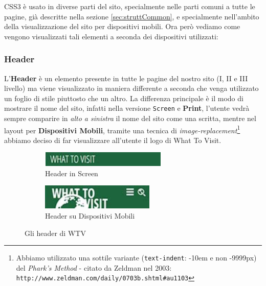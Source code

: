CSS3 è usato in diverse parti del sito, specialmente nelle parti comuni a
tutte le pagine, già descritte nella sezione \ref{sec:struttCommon}, e
specialmente nell'ambito della visualizzazione del sito per dispositivi
mobili. Ora però vediamo come vengono visualizzati tali elementi a seconda dei
dispositivi utilizzati:

\subsubsection{Header}\label{sec:Pres-Header}
L'\textbf{Header} è un elemento presente in tutte le pagine del nostro sito
(I, II e III livello) ma viene visualizzato in maniera differente a seconda
che venga utilizzato un foglio di stile piuttosto che un altro. La differenza
principale è il modo di mostrare il nome del sito, infatti nella versione
\texttt{Screen} e \textbf{Print}, l'utente vedrà sempre comparire in
\textit{alto a sinistra} il nome del sito come una scritta, mentre nel layout
per \textbf{Dispositivi Mobili}, tramite una tecnica di
\textit{image-replacement}\footnote{Abbiamo utilizzato una sottile variante
(\texttt{text-indent}: -10em e non -9999px) del
\textit{Phark's Method} - citato da Zeldman nel 2003:
\texttt{http://www.zeldman.com/daily/0703b.shtml\#au1103}} abbiamo deciso di
far visualizzare all'utente il logo di What To Visit.
\begin{figure}[h!]
  \centering
  \begin{subfigure}[b]{0.3\textwidth}
    \includegraphics[height=0.7cm,width=6cm]{images/pres_header.jpg}
    \caption{Header in Screen}
    \label{fig:Header-screen}
  \end{subfigure}
  \hspace{3cm}
  \begin{subfigure}[b]{0.3\textwidth}
    \includegraphics[height=1.2cm,width=5.4cm]{images/pres_header_m.jpg}
    \caption{Header su Dispositivi Mobili}
    \label{fig:Header-mobile}
  \end{subfigure}
  \caption{Gli header di WTV}\label{fig:Display-Header}
\end{figure}

